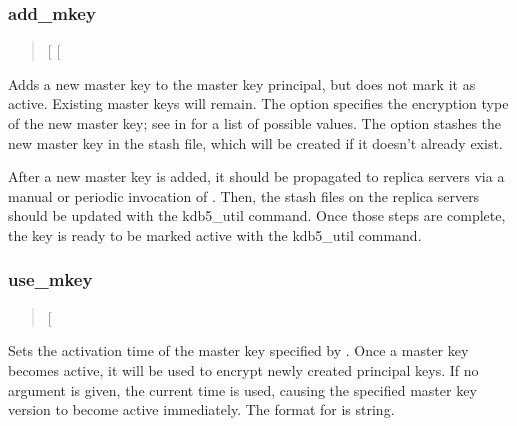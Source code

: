 \documentclass[letterpaper,10pt,english]{sphinxmanual}
\begin{document}
\subsubsection{add\_mkey}
\label{\detokenize{admin/admin_commands/kdb5_util:add-mkey}}\begin{quote}

\sphinxAtStartPar
{} {[} \sphinxstyleemphasis{etype}{]} {[}\sphinxstylestrong{\sphinxhyphen{}s}{]}
\end{quote}

\sphinxAtStartPar
Adds a new master key to the master key principal, but does not mark
it as active.  Existing master keys will remain.  The  option
specifies the encryption type of the new master key; see
{\hyperref[\detokenize{admin/conf_files/kdc_conf:encryption-types}]{}} in {\hyperref[\detokenize{admin/conf_files/kdc_conf:kdc-conf-5}]{}} for a list of possible
values.  The  option stashes the new master key in the stash
file, which will be created if it doesn’t already exist.

\sphinxAtStartPar
After a new master key is added, it should be propagated to replica
servers via a manual or periodic invocation of {\hyperref[\detokenize{admin/admin_commands/kprop:kprop-8}]{}}.  Then,
the stash files on the replica servers should be updated with the
kdb5\_util  command.  Once those steps are complete, the key
is ready to be marked active with the kdb5\_util  command.


\subsubsection{use\_mkey}
\label{\detokenize{admin/admin_commands/kdb5_util:use-mkey}}\begin{quote}

\sphinxAtStartPar
{}  {[}\sphinxstyleemphasis{time}{]}
\end{quote}

\sphinxAtStartPar
Sets the activation time of the master key specified by .
Once a master key becomes active, it will be used to encrypt newly
created principal keys.  If no  argument is given, the current
time is used, causing the specified master key version to become
active immediately.  The format for  is  string.
\end{document}
